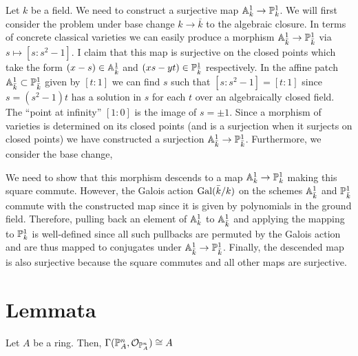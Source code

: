 \documentclass[12pt]{article}
\begin{document}
Let $k$ be a field. We need to construct a surjective map $\A^1_k \to \P^1_k$. We will first consider the problem under base change $k \to \bar{k}$ to the algebraic closure. In terms of concrete classical varieties we can easily produce a morphism $\A^1_{\bar{k}} \to \P^1_{\bar{k}}$ via $s \mapsto [s : s^2 - 1]$. I claim that this map is surjective on the closed points which take the form $(x - s) \in \A^1_{\bar{k}}$ and $(x s - y t) \in \P^1_{\bar{k}}$ respectively. In the affine patch $\A^1_{\bar{k}} \subset \P^1_{\bar{k}}$ given by $[t : 1]$ we can find $s$ such that $[s : s^2 - 1] = [t : 1]$ since $s = (s^2 - 1) t$ has a solution in $s$ for each $t$ over an algebraically closed field. The ``point at infinity'' $[1 : 0]$ is the image of $s = \pm 1$. Since a morphism of varieties is determined on its closed points (and is a surjection when it surjects on closed points) we have constructed a surjection $\A^1_{\bar{k}} \to \P^1_{\bar{k}}$. Furthermore, we consider the base change,
\begin{center}
\end{center}
We need to show that this morphism descends to a map $\A^1_k \to \P^1_k$ making this square commute. However, the Galois action $\Gal{\bar{k}/k}$ on the schemes $\A^1_{\bar{k}}$ and $\P^1_{\bar{k}}$ commute with the constructed map since it is given by polynomials in the ground field. Therefore, pulling back an element of $\A^1_k$ to $\A^1_{\bar{k}}$ and applying the mapping to $\P^1_k$ is well-defined since all such pullbacks are permuted by the Galois action and are thus mapped to conjugates under $\A^1_{\bar{k}} \to \P^1_{\bar{k}}$. Finally, the descended map is also surjective because the square commutes and all other maps are surjective. 

\section{Lemmata}

\begin{lemma} \label{projective_sections}
Let $A$ be a ring. Then, $\Gamma(\mathbb{P}^n_A, \struct{\P^n_A}) \cong A$
\end{lemma}
\end{document}
